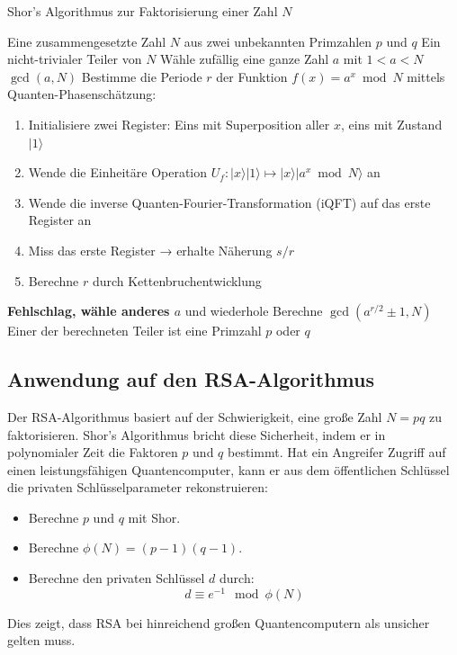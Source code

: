 \begin{algorithm}
\label{algorithm:shor}
\caption{Shor's Algorithmus zur Faktorisierung einer Zahl \( N \)}
\begin{algorithmic}[1]
\Require Eine zusammengesetzte Zahl \( N \) aus zwei unbekannten Primzahlen \( p \) und \( q \)
\Ensure Ein nicht-trivialer Teiler von \( N \)
\State Wähle zufällig eine ganze Zahl \( a \) mit \( 1 < a < N \)
    \State \Return \( \gcd(a, N) \) 
\EndIf
\State Bestimme die Periode \( r \) der Funktion \( f(x) = a^x \bmod N \) mittels Quanten-Phasenschätzung:
    \begin{enumerate}
        \item Initialisiere zwei Register: Eins mit Superposition aller \( x \), eins mit Zustand \( |1\rangle \)
        \item Wende die Einheitäre Operation \( U_f \colon |x\rangle|1\rangle \mapsto |x\rangle|a^x \bmod N\rangle \) an
        \item Wende die inverse Quanten-Fourier-Transformation (iQFT) auf das erste Register an
        \item Miss das erste Register → erhalte Näherung \( s/r \)
        \item Berechne \( r \) durch Kettenbruchentwicklung
    \end{enumerate}
    \State \Return \textbf{Fehlschlag, wähle anderes \( a \)} und wiederhole
\EndIf
\State Berechne \( \gcd(a^{r/2} \pm 1, N) \)
\State \Return Einer der berechneten Teiler ist eine Primzahl \( p \) oder \( q \)
\end{algorithmic}
\end{algorithm}

\subsection{Anwendung auf den RSA-Algorithmus}

\noindent
Der RSA-Algorithmus basiert auf der Schwierigkeit, eine große Zahl \( N = pq \) zu faktorisieren. Shor’s Algorithmus bricht diese Sicherheit, indem er in polynomialer Zeit die Faktoren \( p \) und \( q \) bestimmt. Hat ein Angreifer Zugriff auf einen leistungsfähigen Quantencomputer, kann er aus dem öffentlichen Schlüssel die privaten Schlüsselparameter rekonstruieren:
\begin{itemize}
  \item Berechne \( p \) und \( q \) mit Shor.
  \item Berechne \( \phi(N) = (p-1)(q-1) \).
  \item Berechne den privaten Schlüssel \( d \) durch:
  \[
  d \equiv e^{-1} \mod \phi(N)
  \]
\end{itemize}
Dies zeigt, dass RSA bei hinreichend großen Quantencomputern als unsicher gelten muss.

